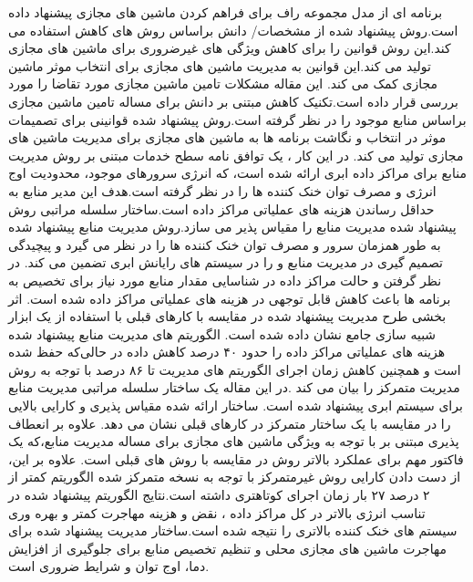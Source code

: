 \cite{num10}
     برنامه ای از مدل مجموعه راف برای فراهم کردن ماشین های مجازی پیشنهاد داده است.روش پیشنهاد شده از مشخصات/ دانش براساس روش های کاهش استفاده می کند.این روش قوانین را برای کاهش ویژگی های غیرضروری برای ماشین های مجازی تولید می کند.این قوانین به مدیریت ماشین های مجازی برای انتخاب موثر ماشین مجازی کمک می کند. این مقاله مشکلات تامین ماشین مجازی مورد تقاضا را مورد بررسی قرار داده است.تکنیک کاهش مبتنی بر دانش برای مساله تامین ماشین مجازی براساس منابع موجود را در نظر گرفته است.روش پیشنهاد شده قوانینی برای تصمیمات موثر در انتخاب و نگاشت برنامه ها به ماشین های مجازی برای مدیریت ماشین های مجازی تولید می کند.
در این کار 
\cite{num11}
، 
یک توافق نامه سطح خدمات 
  مبتنی بر روش مدیریت منابع برای مراکز داده ابری ارائه شده است، که انرژی سرورهای موجود، محدودیت اوج انرژی و مصرف توان خنک کننده ها را در نظر گرفته است.هدف این مدیر منابع به حداقل رساندن هزینه های عملیاتی مراکز داده است.ساختار سلسله مراتبی روش پیشنهاد شده مدیریت منابع را مقیاس پذیر می سازد.روش مدیریت منابع پیشنهاد شده به طور همزمان سرور و مصرف توان خنک کننده ها را در نظر می گیرد و پیچیدگی تصمیم گیری در مدیریت منابع و
   را در سیستم های رایانش ابری تضمین می کند. در نظر گرفتن
    و حالت مراکز داده در شناسایی مقدار منابع مورد نیاز برای تخصیص به برنامه ها باعث کاهش قابل توجهی در هزینه های عملیاتی مراکز داده شده است. اثر بخشی طرح مدیریت پیشنهاد شده در مقایسه با کارهای قبلی با استفاده از یک ابزار شبیه سازی جامع نشان داده شده است. الگوریتم های مدیریت منابع پیشنهاد شده هزینه های عملیاتی مراکز داده را حدود ۴۰ درصد کاهش داده در حالی‌که
     حفظ شده است و همچنین کاهش زمان اجرای الگوریتم های مدیریت تا  ۸۶ درصد با توجه به روش مدیریت متمرکز را بیان می کند .در این مقاله یک ساختار سلسله مراتبی مدیریت منابع برای سیستم ابری پیشنهاد شده است. ساختار ارائه شده مقیاس پذیری و کارایی بالایی را در مقایسه با یک ساختار متمرکز در کارهای قبلی نشان می دهد. علاوه بر انعطاف پذیری مبتنی بر
      با توجه به ویژگی ماشین های مجازی برای مساله مدیریت منابع،که  یک فاکتور مهم برای عملکرد بالاتر روش در مقایسه با روش های قبلی است. علاوه بر این، از دست دادن کارایی روش غیرمتمرکز با توجه به نسخه متمرکز شده الگوریتم کمتر از ۲ درصد ۲۷ بار زمان اجرای کوتاهتری داشته است.نتایج الگوریتم پیشنهاد شده در تناسب انرژی بالاتر در کل مراکز داده ، نقض
      و هزینه مهاجرت کمتر و بهره وری سیستم های خنک کننده بالاتری را نتیجه شده است.ساختار مدیریت پیشنهاد شده برای مهاجرت ماشین های مجازی محلی و تنظیم تخصیص منابع برای جلوگیری از افزایش دما، اوج توان و شرایط
      ضروری است.
